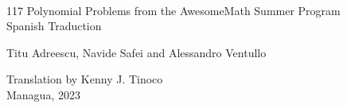 \begin{titlepage}
    \begin{center}
        \ \\ \vspace{8cm}
        {\LARGE 117 Polynomial Problems from the AwesomeMath Summer Program}\\
        \vspace{0.5cm}
        {\Large Spanish Traduction}

        \vspace{2cm}
        {\Large Titu Adreescu, Navide Safei and Alessandro Ventullo}

        \vfill
        {\large Translation by Kenny J. Tinoco}\\
        \vspace{0.35cm}
        {\large Managua, 2023}

    \end{center}
\end{titlepage}